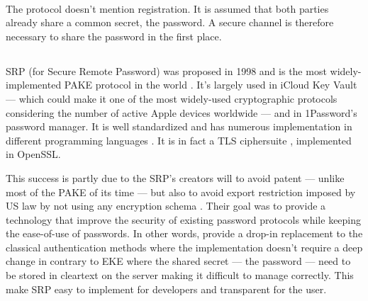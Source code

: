 \documentclass[../report.tex]{subfiles}
\begin{document}

\paragraph{}
The protocol doesn't mention registration. It is assumed that both parties already share a common secret, the password. A secure channel is therefore necessary to share the password in the first place.





\subsection{}

\paragraph{}

SRP \cite{SRP_Paper, SRP_6_Paper} (for Secure Remote Password) was proposed in 1998 and is the most widely-implemented PAKE protocol in the world \cite{PAKE_Green_blog}.
It's largely used in iCloud Key Vault --- which could make it one of the most widely-used cryptographic protocols \cite{PAKE_Green_blog} considering the number of active Apple devices worldwide --- and in 1Password's password manager.
It is well standardized and has numerous implementation in different programming languages \cite{http://srp.stanford.edu/links.html}.
It is in fact a TLS ciphersuite \cite{SRP_RFC_3}, implemented in OpenSSL.

This success is partly due to the SRP's creators will to avoid patent --- unlike most of the PAKE of its time --- but also to avoid export restriction imposed by US law by not using any encryption schema \cite{Formal Methods Analysis of the Secure Remote Password Protocol (2020)}.
Their goal was to provide a technology that improve the security of existing password protocols while keeping the ease-of-use of passwords. In other words, provide a drop-in replacement to the classical authentication methods where the implementation doesn't require a deep change in contrary to EKE where the shared secret --- the password --- need to be stored in cleartext on the server making it difficult to manage correctly.
This make SRP easy to implement for developers and transparent for the user.
\end{document}

